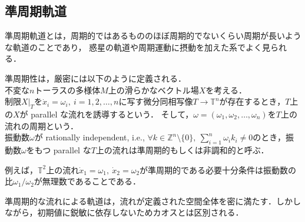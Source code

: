 \documentclass[../main]{subfiles}
\begin{document}
\subsection{準周期軌道}
準周期軌道とは，周期的ではあるもののほぼ周期的でないくらい周期が長いような軌道のことであり，
惑星の軌道や周期運動に摂動を加えた系でよく見られる．

準周期性は，厳密には以下のように定義される\cite{Broer1996}．\\
不変な$n$トーラスの多様体$M$上の滑らかなベクトル場$X$を考える．\\
制限$X|_T$を$\dot{x}_i=\omega_i,\ i=1,2,\ldots ,n$に写す微分同相写像$T\to \mathbb{T}^n$が存在するとき，$T$上の$X$が parallel な流れを誘導するという．
そして，$\omega=(\omega_1,\omega_2,\ldots,\omega_n)$を$T$上の流れの周期という．\\
振動数$\omega$が rationally independent, i.e., $\forall k\in\mathbb{Z}^n\setminus \{0\},\ \sum_{i=1}^n\omega_ik_i\neq 0$のとき，振動数$\omega$をもつ parallel な$T$上の流れは準周期的もしくは非調和的と呼ぶ．

例えば，$\mathbb{T}^2$上の流れ$\dot{x}_1=\omega_1,\ \dot{x}_2=\omega_2$が準周期的である必要十分条件は振動数の比$\omega_1/\omega_2$が無理数であることである．

準周期的な流れによる軌道は，流れが定義された空間全体を密に満たす．しかしながら，初期値に鋭敏に依存しないためカオスとは区別される．
\end{document}
